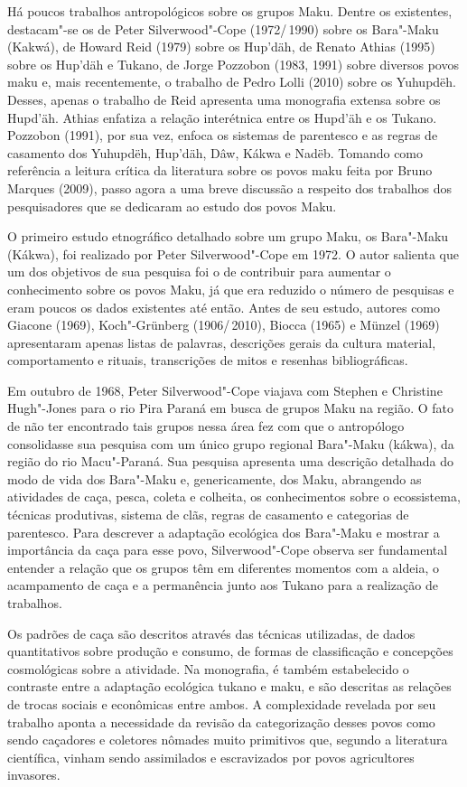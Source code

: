 Há poucos trabalhos antropológicos sobre os grupos Maku. Dentre os
existentes, destacam"-se os de Peter Silverwood"-Cope (1972/\,1990) sobre os
Bara"-Maku (Kakwá), de Howard Reid (1979) sobre os Hup'däh, de Renato
Athias (1995) sobre os Hup'däh e Tukano, de Jorge Pozzobon (1983, 1991)
sobre diversos povos maku e, mais recentemente, o trabalho de Pedro
Lolli (2010) sobre os Yuhupdëh. Desses, apenas o trabalho de Reid
apresenta uma monografia extensa sobre os Hupd'äh. Athias enfatiza a
relação interétnica entre os Hupd'äh e os Tukano. Pozzobon (1991), por
sua vez, enfoca os sistemas de parentesco e as regras de casamento dos
Yuhupdëh, Hup'däh, Dâw, Kákwa e Nadëb. Tomando como referência a leitura
crítica da literatura sobre os povos maku feita por Bruno Marques
(2009), passo agora a uma breve discussão a respeito dos trabalhos dos
pesquisadores que se dedicaram ao estudo dos povos Maku.

O primeiro estudo etnográfico detalhado sobre um grupo Maku, os
Bara"-Maku (Kákwa), foi realizado por Peter Silverwood"-Cope em 1972. O
autor salienta que um dos objetivos de sua pesquisa foi o de contribuir
para aumentar o conhecimento sobre os povos Maku, já que era reduzido o
número de pesquisas e eram poucos os dados existentes até então. Antes
de seu estudo, autores como Giacone (1969), Koch"-Grünberg (1906/\,2010),
Biocca (1965) e Münzel (1969) apresentaram apenas listas de palavras,
descrições gerais da cultura material, comportamento e rituais,
transcrições de mitos e resenhas bibliográficas.

Em outubro de 1968, Peter Silverwood"-Cope viajava com Stephen e
Christine Hugh"-Jones para o rio Pira Paraná em busca de grupos Maku na
região. O fato de não ter encontrado tais grupos nessa área fez com que
o antropólogo consolidasse sua pesquisa com um único grupo regional
Bara"-Maku (kákwa), da região do rio Macu"-Paraná. Sua pesquisa apresenta
uma descrição detalhada do modo de vida dos Bara"-Maku e, genericamente,
dos Maku, abrangendo as atividades de caça, pesca, coleta e colheita, os
conhecimentos sobre o ecossistema, técnicas produtivas, sistema de clãs,
regras de casamento e categorias de parentesco. Para descrever a
adaptação ecológica dos Bara"-Maku e mostrar a importância da caça para
esse povo, Silverwood"-Cope observa ser fundamental entender a relação
que os grupos têm em diferentes momentos com a aldeia, o acampamento de
caça e a permanência junto aos Tukano para a realização de trabalhos.

Os padrões de caça são descritos através das técnicas utilizadas, de
dados quantitativos sobre produção e consumo, de formas de classificação
e concepções cosmológicas sobre a atividade. Na monografia, é também
estabelecido o contraste entre a adaptação ecológica tukano e maku, e
são descritas as relações de trocas sociais e econômicas entre ambos. A
complexidade revelada por seu trabalho aponta a necessidade da revisão
da categorização desses povos como sendo caçadores e coletores nômades
muito primitivos que, segundo a literatura científica, vinham sendo
assimilados e escravizados por povos agricultores invasores.

